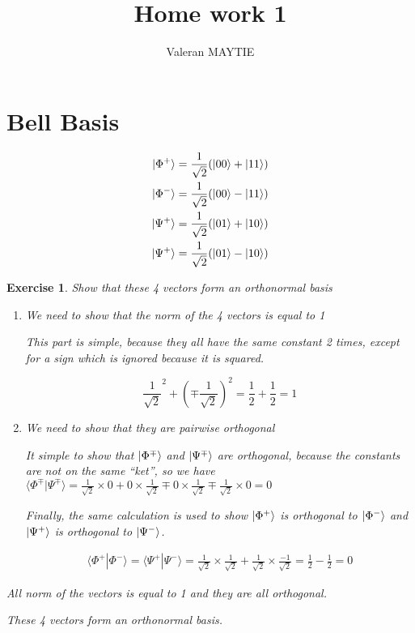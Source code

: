 \documentclass{article}
\title{Home work 1}
\author{Valeran MAYTIE}
\date{}
\theoremstyle{plain}
\newtheorem{exo}{Exercise}%
\begin{document}
  \maketitle

  \section{Bell Basis}

    \begin{align*}
      \ket{\Phi^+} &= \frac{1}{\sqrt 2} (\ket{00} + \ket{11}) \\
      \ket{\Phi^-} &= \frac{1}{\sqrt 2} (\ket{00} - \ket{11}) \\
      \ket{\Psi^+} &= \frac{1}{\sqrt 2} (\ket{01} + \ket{10}) \\
      \ket{\Psi^+} &= \frac{1}{\sqrt 2} (\ket{01} - \ket{10})
    \end{align*}

    \begin{exo}
      Show that these 4 vectors form an orthonormal basis

      \begin{enumerate}
        \item We need to show that the norm of the 4 vectors is equal to 1

          This part is simple, because they all have the same constant 2 times,
          except for a sign which is ignored because it is squared.

          $$ \frac{1}{\sqrt 2}^2 + (\mp\frac{1}{\sqrt 2})^2
             = \frac 1 2 + \frac 1 2 = 1$$

        \item We need to show that they are pairwise orthogonal

          It simple to show that $\ket{\Phi^\mp}$ and $\ket{\Psi^\mp}$ are
          orthogonal, because the constants are not on the same ``ket'', so we
          have $\langle \Phi^\mp|\Psi^\mp \rangle =
          \frac{1}{\sqrt{2}} \times 0 
          +   0 \times \frac{1}{\sqrt{2}}
          \mp 0 \times \frac{1}{\sqrt{2}}
          \mp \frac{1}{\sqrt{2}} \times 0 = 0$

          Finally, the same calculation is used to show $\ket{\Phi^+}$ is
          orthogonal to $\ket{\Phi^-}$ and $\ket{\Psi^+}$ is orthogonal to
          $\ket{\Psi^-}$.

          \begin{align*}
            \langle \Phi^+ | \Phi^- \rangle = \langle \Psi^+ | \Psi^- \rangle
            = \frac{1}{\sqrt{2}} \times \frac{1}{\sqrt{2}} +
              \frac{1}{\sqrt{2}} \times \frac{-1}{\sqrt{2}}
            = \frac 1 2 - \frac 1 2 = 0
          \end{align*}
      \end{enumerate}

      All norm of the vectors is equal to 1 and they are all orthogonal.

      These 4 vectors form an orthonormal basis.
    \end{exo}
\end{document}
